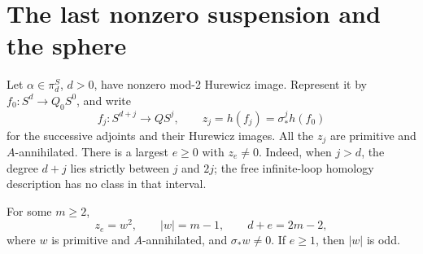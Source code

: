 \section{The last nonzero suspension and the sphere}\label{sec:conclusion}

Let \(\alpha\in\pi_d^S\), \(d>0\), have nonzero mod-2 Hurewicz
image. Represent it by \(f_0:S^d\to Q_0S^0\), and write
\[
f_j:S^{d+j}\longrightarrow QS^j,\qquad
z_j=h(f_j)=\sigma_*^j h(f_0)
\]
for the successive adjoints and their Hurewicz images. All the \(z_j\)
are primitive and \(A\)-annihilated. There is a largest \(e\ge0\)
with \(z_e\ne0\). Indeed, when \(j>d\), the degree \(d+j\) lies
strictly between \(j\) and \(2j\); the free infinite-loop homology
description has no class in that interval.

\begin{lemma}\label{lem:last-root}
For some \(m\ge2\),
\begin{equation}\label{eq:last-square}
z_e=w^2,\qquad |w|=m-1,\qquad d+e=2m-2,
\end{equation}
where \(w\) is primitive and \(A\)-annihilated, and
\(\sigma_*w\ne0\). If \(e\ge1\), then \(|w|\) is odd.
\end{lemma}

